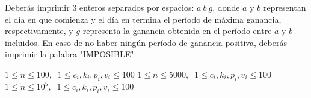 \documentclass{oci}
\begin{document}
\begin{outputDescription}
Deberás imprimir $3$ enteros separados por espacios: $a \: b \: g$, donde $a$ y $b$ representan el día en que comienza y el día en termina el período de máxima ganancia, respectivamente, y $g$ representa la ganancia obtenida en el período entre $a$ y $b$ incluidos. En caso de no haber ningún período de ganancia positiva, deberás imprimir la palabra "IMPOSIBLE".
\end{outputDescription}

\begin{scoreDescription}
  $1 \leq n \leq 100, \; \; 1 \leq c_i, k_i, p_i, v_i \leq 100$ 
  $1 \leq n \leq 5000, \; \; 1 \leq c_i, k_i, p_i, v_i \leq 100$ 
  $1 \leq n \leq 10^5, \; \; 1 \leq c_i, k_i, p_i, v_i \leq 100$ 
\end{scoreDescription}

\begin{sampleDescription}
\end{sampleDescription}
\end{document}
